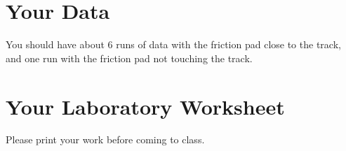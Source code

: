 \section{Your Data}
%
You should have about 6 runs of data with the friction pad close to the track, and one run with the friction pad not touching the track.
%
%
\newpage
\section{Your Laboratory Worksheet}
%
Please print your work before coming to class.
%
